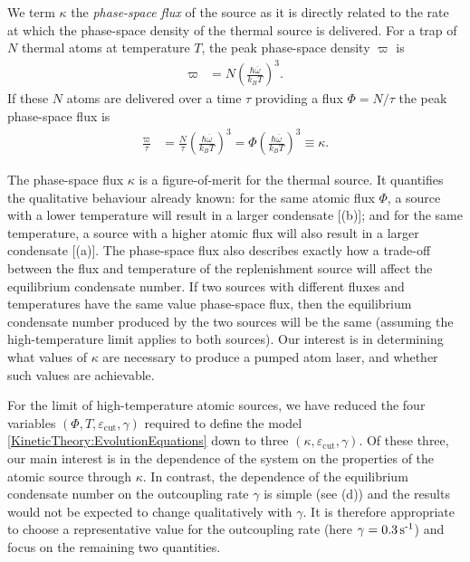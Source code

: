 We term $\kappa$ the \emph{phase-space flux} of the source as it is directly related to the rate at which the phase-space density of the thermal source is delivered.  For a trap of $N$ thermal atoms at temperature $T$, the peak phase-space density $\varpi$ is~\citep[Chapter 2]{PethickSmith}
\begin{align}
    \varpi &= N \left(\frac{\hbar \overline{\omega}}{k_B T} \right)^3.
\end{align}
If these $N$ atoms are delivered over a time $\tau$ providing a flux $\Phi = N/\tau$ the peak phase-space flux is
\begin{align}
    \frac{\varpi}{\tau} &= \frac{N}{\tau}\left(\frac{\hbar \overline{\omega}}{k_B T}\right)^3 = \Phi \left(\frac{\hbar \overline{\omega}}{k_B T}\right)^3 \equiv \kappa.
\end{align}

The phase-space flux $\kappa$ is a figure-of-merit for the thermal source.  It quantifies the qualitative behaviour already known: for the same atomic flux $\Phi$, a source with a lower temperature will result in a larger condensate [(b)]; and for the same temperature, a source with a higher atomic flux will also result in a larger condensate [(a)].  The phase-space flux also describes exactly how a trade-off between the flux and temperature of the replenishment source will affect the equilibrium condensate number.  If two sources with different fluxes and temperatures have the same value phase-space flux, then the equilibrium condensate number produced by the two sources will be the same (assuming the high-temperature limit applies to both sources).  Our interest is in determining what values of $\kappa$ are necessary to produce a pumped atom laser, and whether such values are achievable.

For the limit of high-temperature atomic sources, we have reduced the four variables $(\Phi, T, \varepsilon_\text{cut}, \gamma)$ required to define the model \eqref{KineticTheory:EvolutionEquations} down to three $(\kappa, \varepsilon_\text{cut}, \gamma)$. Of these three, our main interest is in the dependence of the system on the properties of the atomic source through $\kappa$. In contrast, the dependence of the equilibrium condensate number on the outcoupling rate $\gamma$ is simple (see (d)) and the results would not be expected to change qualitatively with $\gamma$. It is therefore appropriate to choose a representative value for the outcoupling rate (here $\gamma = \unit[0.3]{s\textsuperscript{-1}}$) and focus on the remaining two quantities.

